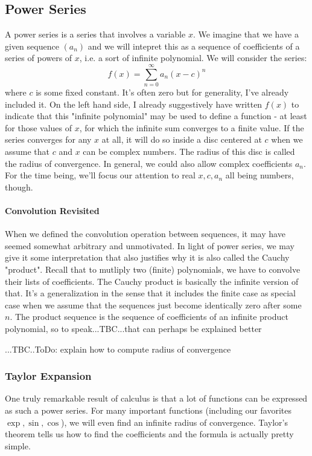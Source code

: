 \subsection{Power Series}
A power series is a series that involves a variable $x$. We imagine that we have a given sequence $(a_n)$ and we will intepret this as a sequence of coefficients of a series of powers of $x$, i.e. a sort of infinite polynomial. We will consider the series:
\begin{equation}
 f(x) = \sum_{n=0}^\infty a_n (x-c)^n
\end{equation}
where $c$ is some fixed constant. It's often zero but for generality, I've already included it. On the left hand side, I already suggestively have written $f(x)$ to indicate that this "infinite polynomial" may be used to define a function - at least for those values of $x$, for which the infinite sum converges to a finite value. If the series converges for any $x$ at all, it will do so inside a disc centered at $c$ when we assume that $c$ and $x$ can be complex numbers. The radius of this disc is called the radius of convergence. In general, we could also allow complex coefficients $a_n$. For the time being, we'll focus our attention to real $x,c,a_n$ all being numbers, though.


\paragraph{Convolution Revisited}
When we defined the convolution operation between sequences, it may have seemed somewhat arbitrary and unmotivated. In light of power series, we may give it some interpretation that also justifies why it is also called the Cauchy "product". Recall that to mutliply two (finite) polynomials, we have to convolve their lists of coefficients. The Cauchy product is basically the infinite version of that. It's a generalization in the sense that it includes the finite case as special case when we assume that the sequences just become identically zero after some $n$. The product sequence is the sequence of coefficients of an infinite product polynomial, so to speak...TBC...that can perhaps be explained better

...TBC..ToDo: explain how to compute radius of convergence


\subsubsection{Taylor Expansion}
One truly remarkable result of calculus is that a lot of functions can be expressed as such a power series. For many important functions (including our favorites $\exp, \sin, \cos$), we will even find an infinite radius of convergence. Taylor's theorem tells us how to find the coefficients and the formula is actually pretty simple. 

